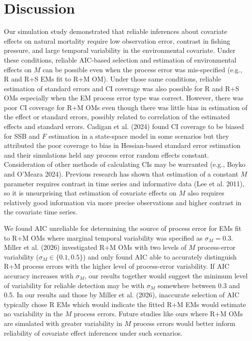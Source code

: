 \documentclass[
  12pt,
]{article}
\begin{document}
\section*{Discussion}\label{discussion}

Our simulation study demonstrated that reliable inferences about
covariate effects on natural mortality require low observation error,
contrast in fishing pressure, and large temporal variability in the
environmental covariate. Under these conditions, reliable AIC-based
selection and estimation of environmental effects on \(M\) can be
possible even when the process error was mis-specified (e.g., R and R+S
EMs fit to R+M OM). Under those same conditions, reliable estimation of
standard errors and CI coverage was also possible for R and R+S OMs
especially when the EM process error type was correct. However, there
was poor CI coverage for R+M OMs even though there was little bias in
estimation of the effect or standard errors, possibly related to
correlation of the estimated effects and standard errors. Cadigan et al.
(2024) found CI coverage to be biased for SSB and \(F\) estimation in a
state-space model in some scenarios but they attributed the poor
coverage to bias in Hessian-based standard error estimation and their
simulations held any process error random effects constant.
Consideration of other methods of calculating CIs may be warranted
(e.g., Boyko and O'Meara 2024). Previous research has shown that
estimation of a constant \(M\) parameter requires contrast in time
series and informative data (Lee et al. 2011), so it is unsurprising
that estimation of covariate effects on \(M\) also requires relatively
good information via more precise observations and higher contrast in
the covariate time series.

We found AIC unreliable for determining the source of process error for
EMs fit to R+M OMs where marginal temporal variability was specified as
\(\sigma_M = 0.3\). Miller et al. (2026) investigated R+M OMs with two
levels of \(M\) process-error variability (\(\sigma_M \in \{0.1,0.5\}\))
and only found AIC able to accurately distinguish R+M process errors
with the higher level of process-error variability. If AIC accuracy
increases with \(\sigma_M\), our results together would suggest the
minimum level of variability for reliable detection may be with
\(\sigma_M\) somewhere between 0.3 and 0.5. In our results and those by
Miller et al. (2026), inaccurate selection of AIC typically chose R EMs
which would indicate the fitted R+M EMs would estimate no variability in
the \(M\) process errors. Future studies like ours where R+M OMs are
simulated with greater variability in \(M\) process errors would better
inform reliability of covariate effect inferences under such scenarios.
\end{document}
